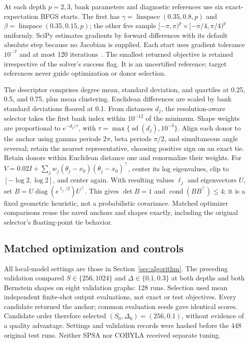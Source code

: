\documentclass[11pt]{article}
\newcommand{\diag}{\operatorname{diag}}
\begin{document}
At each depth $p=2,3$, bank parameters and diagnostic references use six
exact-expectation BFGS starts. The first has
$\gamma=\operatorname{linspace}(0.35,0.8,p)$ and
$\beta=\operatorname{linspace}(0.35,0.15,p)$; the other five sample
$[-\pi,\pi)^p\times[-\pi/4,\pi/4)^p$ uniformly.
SciPy estimates gradients by forward differences with its default absolute
step because no Jacobian is supplied. Each start uses gradient tolerance
$10^{-7}$ and at most 120 iterations~\cite{nocedal2006,scipy2020}.
The smallest returned objective is retained irrespective of the solver's
success flag. It is an uncertified reference; target references never guide
optimization or donor selection.

The descriptor comprises degree mean, standard deviation, and quartiles
at 0.25, 0.5, and 0.75, plus mean clustering. Euclidean differences are
scaled by bank standard deviations floored at 0.1. From distances $d_j$,
the resolution-aware selector takes the first bank index within $10^{-12}$
of the minimum. Shape weights are proportional to $e^{-d_j/\tau}$, with
$\tau=\max\{\operatorname{sd}(d_j),10^{-3}\}$. Align each donor to the
anchor using gamma periods $2\pi$, beta periods $\pi/2$, and simultaneous
angle reversal; retain the nearest representative, choosing positive sign
on an exact tie. Retain donors within Euclidean distance one and renormalize
their weights. For
$V=0.02I+\sum_jw_j(\theta_j-x_0)(\theta_j-x_0)^\top$, center its log
eigenvalues, clip to $[-\log2,\log2]$, and center again. With resulting
values $\ell_j$ and eigenvectors $U$, set
$B=U\diag(e^{\ell_j/2})U^\top$. This gives $\det B=1$ and
$\operatorname{cond}(BB^\top)\le4$; it is a fixed geometric heuristic,
not a probabilistic covariance. Matched optimizer comparisons reuse the
saved anchors and shapes exactly, including the original selector's
floating-point tie behavior.

\subsection{Matched optimization and controls}
All local-model settings are those in Section~\ref{sec:algorithm}.
The preceding validation compared $S\in\{256,1024\}$ and
$\Delta\in\{0.1,0.3\}$ at both depths and both Bernstein shapes on eight
validation graphs: 128 runs. Selection used mean independent finite-shot
output evaluations, not exact or test objectives. Every candidate returned
the anchor; common evaluation seeds gave identical scores. Candidate order
therefore selected $(S_0,\Delta_0)=(256,0.1)$, without evidence of a
quality advantage. Settings and validation records were hashed before the
448 original test runs. Neither SPSA nor COBYLA received separate tuning.
\end{document}
